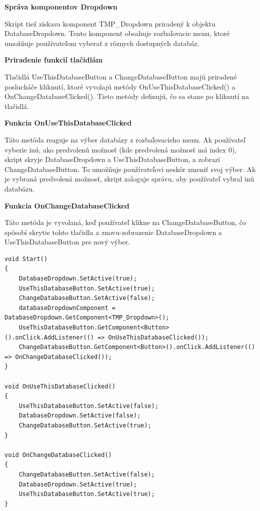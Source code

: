 {\small\textbf{Správa komponentov Dropdown}}

Skript tiež získava komponent TMP\_Dropdown priradený k objektu DatabaseDropdown. Tento komponent obsahuje rozbaľovacie menu, ktoré umožňuje používateľom vyberať z rôznych dostupných databáz.

{\small\textbf{Priradenie funkcií tlačidlám}}

Tlačidlá UseThisDatabaseButton a ChangeDatabaseButton majú priradené poslucháče kliknutí, ktoré vyvolajú metódy OnUseThisDatabaseClicked() a OnChangeDatabaseClicked(). Tieto metódy definujú, čo sa stane po kliknutí na tlačidlá.

{\small\textbf{Funkcia OnUseThisDatabaseClicked}}

Táto metóda reaguje na výber databázy z rozbaľovacieho menu. Ak používateľ vyberie inú, ako predvolenú možnosť (kde predvolená možnosť má index 0), skript skryje DatabaseDropdown a UseThisDatabaseButton, a zobrazí ChangeDatabaseButton. To umožňuje používateľovi neskôr zmeniť svoj výber. Ak je vybraná predvolená možnosť, skript zaloguje správu, aby používateľ vybral inú databázu.

{\small\textbf{Funkcia OnChangeDatabaseClicked}}

Táto metóda je vyvolaná, keď používateľ klikne na ChangeDatabaseButton, čo spôsobí skrytie tohto tlačidla a znovu-zobrazenie DatabaseDropdown a UseThisDatabaseButton pre nový výber.

\lstset{style=Csharp}
\begin{lstlisting}[caption={ChangeDatabaseController Class - Zmena skenovacej databázy aplikácie}, label=changeDatabaseController]
void Start()
{
    DatabaseDropdown.SetActive(true);
    UseThisDatabaseButton.SetActive(true);
    ChangeDatabaseButton.SetActive(false);
    databaseDropdownComponent = DatabaseDropdown.GetComponent<TMP_Dropdown>();
    UseThisDatabaseButton.GetComponent<Button>().onClick.AddListener(() => OnUseThisDatabaseClicked());
    ChangeDatabaseButton.GetComponent<Button>().onClick.AddListener(() => OnChangeDatabaseClicked());
}

void OnUseThisDatabaseClicked()
{
    UseThisDatabaseButton.SetActive(false);
    DatabaseDropdown.SetActive(false);
    ChangeDatabaseButton.SetActive(true);
}

void OnChangeDatabaseClicked()
{
    ChangeDatabaseButton.SetActive(false);
    DatabaseDropdown.SetActive(true);
    UseThisDatabaseButton.SetActive(true);
}
\end{lstlisting}

